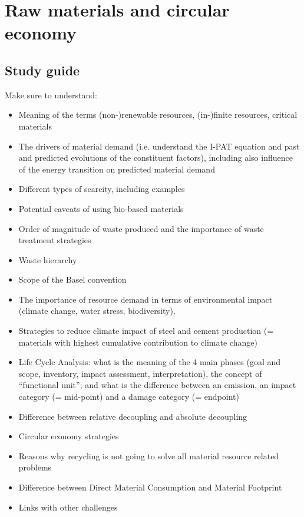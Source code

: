 \documentclass[../summary.tex]{subfiles}
\begin{document}
\section{Raw materials and circular economy}

\subsection{Study guide}

Make sure to understand:
\begin{itemize}
	\setlength{\itemsep}{0pt}
	\item Meaning of the terms (non-)renewable resources, (in-)finite resources, critical materials
	\item The drivers of material demand (i.e. understand the I-PAT equation and past and predicted evolutions of the constituent factors), including also influence of the energy transition on predicted material demand
	\item Different types of scarcity, including examples
	\item Potential caveats of using bio-based materials
	\item Order of magnitude of waste produced and the importance of waste treatment strategies
	\item Waste hierarchy
	\item Scope of the Basel convention
	\item The importance of resource demand in terms of environmental impact (climate change, water stress, biodiversity).
	\item Strategies to reduce climate impact of steel and cement production (= materials with highest cumulative contribution to climate change)
	\item Life Cycle Analysis: what is the meaning of the 4 main phases (goal and scope, inventory, impact assessment, interpretation), the concept of “functional unit”; and what is the difference between
	      an emission, an impact category (= mid-point) and a damage category (= endpoint)
	\item Difference between relative decoupling and absolute decoupling
	\item Circular economy strategies
	\item Reasons why recycling is not going to solve all material resource related problems
	\item Difference between Direct Material Consumption and Material Footprint
	\item Links with other challenges
\end{itemize}
\end{document}
